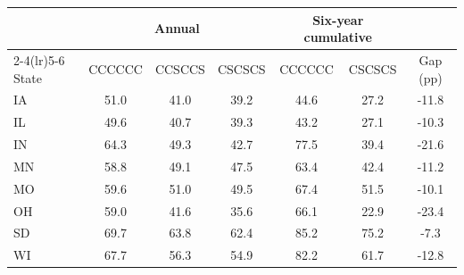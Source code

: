 \begin{tabular}{lcccccc}
\toprule
& \multicolumn{3}{c}{Annual} & \multicolumn{2}{c}{Six-year cumulative} & \\
\cmidrule(lr){2-4}\cmidrule(lr){5-6}
State & CCCCCC & CCSCCS & CSCSCS & CCCCCC & CSCSCS & Gap (pp)\\
\midrule
IA & 51.0 & 41.0 & 39.2 & 44.6 & 27.2 & -11.8 \\
IL & 49.6 & 40.7 & 39.3 & 43.2 & 27.1 & -10.3 \\
IN & 64.3 & 49.3 & 42.7 & 77.5 & 39.4 & -21.6 \\
MN & 58.8 & 49.1 & 47.5 & 63.4 & 42.4 & -11.2 \\
MO & 59.6 & 51.0 & 49.5 & 67.4 & 51.5 & -10.1 \\
OH & 59.0 & 41.6 & 35.6 & 66.1 & 22.9 & -23.4 \\
SD & 69.7 & 63.8 & 62.4 & 85.2 & 75.2 & -7.3 \\
WI & 67.7 & 56.3 & 54.9 & 82.2 & 61.7 & -12.8 \\
\bottomrule
\end{tabular}
